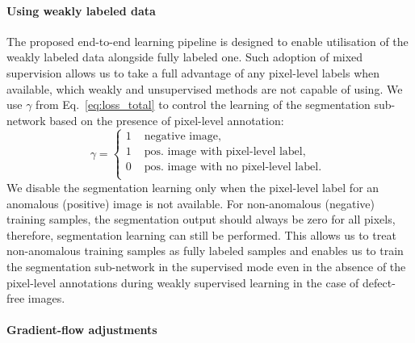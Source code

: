 \paragraph{Using weakly labeled data}
The proposed end-to-end learning pipeline is designed to enable utilisation of the weakly labeled data alongside fully labeled one. Such adoption of mixed supervision allows us to take a full advantage of any pixel-level labels when available, which weakly and unsupervised methods are not capable of using. We use $\gamma$ from Eq.~\ref{eq:loss_total} to control the learning of the segmentation sub-network based on the presence of pixel-level annotation:
\begin{equation}
    \gamma = \begin{cases} 
    1 &\text{ negative image, }\\
    1 &\text{ pos. image with pixel-level label,  }\\
    0 &\text{ pos. image with no pixel-level label.  }\\
    \end{cases}
\end{equation}
We disable the segmentation learning only when the pixel-level label for an anomalous (positive) image is not available. For non-anomalous (negative) training samples, the segmentation output should always be zero for all pixels, therefore, segmentation learning can still be performed.
This allows us to treat non-anomalous training samples as fully labeled samples and enables us to train the segmentation sub-network in the supervised  mode even in the absence of the pixel-level annotations during weakly supervised learning in the case of defect-free images.

\paragraph{Gradient-flow adjustments}

